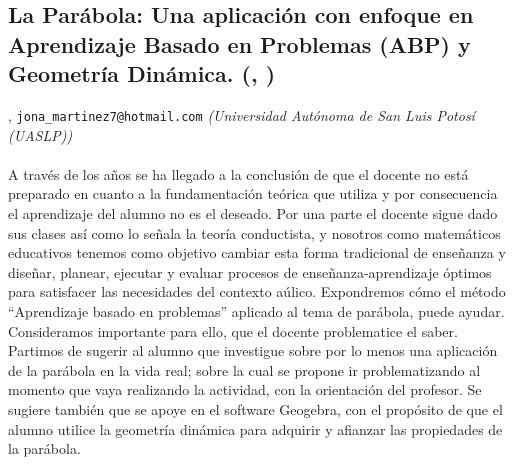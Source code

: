\subsection{\sffamily La Parábola:  Una aplicación con enfoque en Aprendizaje Basado en Problemas (ABP) y Geometría Dinámica. {\footnotesize (, )}} \label{reg-956} 
, {\tt jona_martinez7@hotmail.com}  {\slshape (Universidad Autónoma de San Luis Potosí (UASLP))}\\
\\
\noindent A través de los años se ha llegado a la conclusión de que el docente no está preparado en cuanto a la fundamentación teórica que utiliza y por consecuencia el aprendizaje del alumno no es el deseado. Por una parte el docente sigue dado sus clases así como lo señala la teoría conductista, y nosotros como matemáticos educativos tenemos como objetivo cambiar esta forma tradicional de enseñanza y diseñar, planear, ejecutar y evaluar procesos de enseñanza-aprendizaje óptimos para satisfacer las necesidades del contexto aúlico. Expondremos cómo el método “Aprendizaje basado en problemas” aplicado al tema de parábola, puede ayudar. Consideramos importante para ello, que el docente problematice el saber. Partimos de sugerir al alumno que investigue  sobre por lo menos una aplicación de la parábola en la vida real; sobre la cual se propone ir problematizando al momento que vaya realizando la actividad, con la orientación del profesor. Se sugiere también que se apoye en el software Geogebra, con el propósito de que el alumno utilice la geometría dinámica para adquirir y afianzar las propiedades de la parábola.
